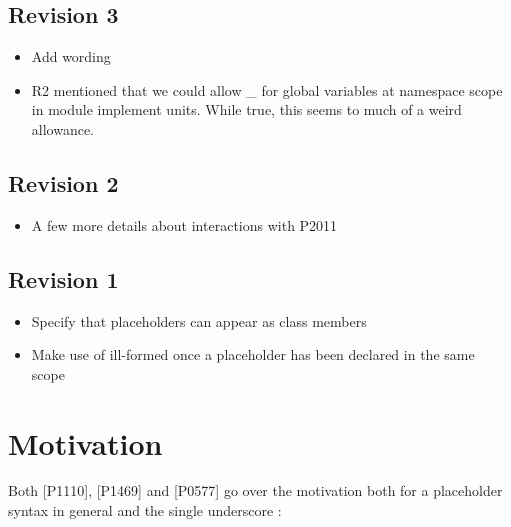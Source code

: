 \documentclass{wg21}
\begin{document}
\subsection{Revision 3}

\begin{itemize}
\item Add wording
\item R2 mentioned that we could allow _ for global variables at namespace scope in module implement units. While true, this seems to much of a weird allowance.
\end{itemize}

\subsection{Revision 2}

\begin{itemize}
    \item A few more details about interactions with P2011
\end{itemize}

\subsection{Revision 1}

\begin{itemize}
   \item Specify that placeholders can appear as class members
   \item Make use of \tcode{_} ill-formed once a placeholder has been declared in the same scope
\end{itemize}

\section{Motivation}

Both [P1110]\cite{P1110R0}, [P1469]\cite{P1469R0} and [P0577]\cite{P0577R0} go over the motivation both for a placeholder syntax in general and
the single underscore \tcode{_}:
\end{document}
